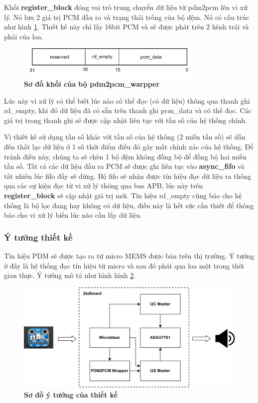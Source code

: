Khối \textbf{register\_block} đóng vai trò trung chuyển dữ liệu từ pdm2pcm lên vi xử lý. Nó lưu 2 giá trị PCM đầu ra và trạng thái trống của bộ đệm. Nó có cấu trúc như hình \ref{bit}. Thiết kế này chỉ lấy 16bit PCM và sẽ được phát trên 2 kênh trái và phải của loa.

\begin{figure}[H]
    \centering
    \includegraphics[width=9cm]{Images/Chuong5/fpga/bit.png}
    \caption[Sơ đồ khối của bộ pdm2pcm\_warpper]{\bfseries \fontsize{12pt}{0pt}\selectfont Sơ đồ khối của bộ pdm2pcm\_warpper}
    \label{bit}
\end{figure}

Lúc này vi xử lý có thể biết lúc nào có thể đọc (có dữ liệu) thông qua thanh ghi rd\_empty, khi đó dữ liệu đã có sẵn trên thanh ghi pcm\_data và có thế đọc. Các giá trị trong thanh ghi sẽ được cập nhật liên tục với tần số của hệ thống chính.

Vì thiết kế sử dụng tần số khác với tần số của hệ thống (2 miền tần số) sẽ dẫn đến thất lạc dữ liệu ở 1 số thời điểm điều đó gây mất chính xác của hệ thống. Để tránh điều này, chúng ta sẽ chèn 1 bộ đệm không đồng bộ để đồng bộ hai miền tần số. Tất cả các dữ liệu đầu ra PCM sẽ được ghi liên tục vào \textbf{async\_fifo} và tất nhiên lúc fifo đầy sẽ dừng. Bộ fifo sẽ nhận được tín hiệu đọc dữ liệu ra thông qua các sự kiện đọc từ vi xử lý thông qua bus APB, lúc này trên \textbf{register\_block} sẽ cập nhật giá trị mới. Tín hiệu rd\_empty cũng báo cho hệ thống là bộ lọc đang hay không có dữ liệu, điều này là hết sức cần thiết để thông báo cho vi xử lý biến lúc nào cần lấy dữ liệu.

\subsubsection{Ý tưởng thiết kế}

Tín hiệu PDM sẽ được tạo ra từ micro MEMS được bán trên thị trường. Ý tưởng ở đây là hệ thống đọc tín hiệu từ micro và sau đó phát qua loa một trong thời gian thực.
Ý tưởng mô tả như hình hình \ref{pinouts}.
\begin{figure}[H]
    \centering
    \includegraphics[width=14cm]{Images/Chuong5/fpga/top.png}
    \caption[Sơ đồ ý tưởng của thiết kế]{\bfseries \fontsize{12pt}{0pt}\selectfont Sơ đồ ý tưởng của thiết kế}
    \label{pinouts}
\end{figure}

